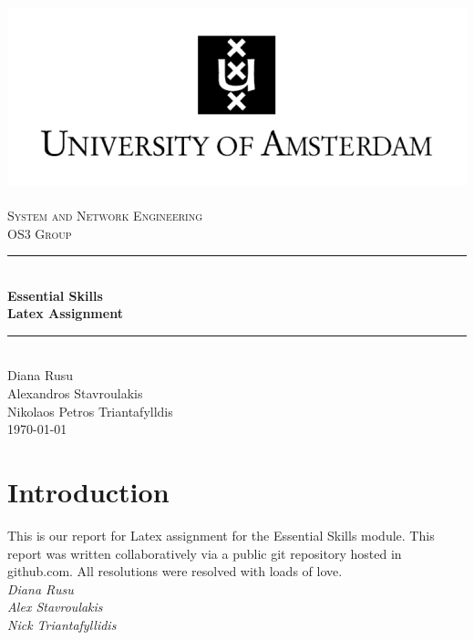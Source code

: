 \documentclass[a4paper,11pt]{report}
\newcommand{\HRule}{\rule{\linewidth}{0.5mm}}
\begin{document}
\begin{titlepage}

\begin{center}

\includegraphics{images/UvA-logo-2a.png}~\\[1cm]

\textsc{\LARGE System and Network Engineering\\ OS3 Group}\\[1.5cm]

\HRule \\

{ \huge \bfseries Essential Skills\\Latex Assignment}

\HRule \\[1cm]

\large{Diana Rusu} \\
\large{Alexandros Stavroulakis}\\
\large{Nikolaos Petros Triantafylldis}\\[11cm]

\today
\end{center}
\end{titlepage}

\tableofcontents

\listoffigures

\chapter* {Introduction}

This is our report for Latex assignment for the Essential Skills module. This report was written collaboratively via a public git repository hosted in github.com. All resolutions were resolved with loads of love. \\[0.5 cm]
\emph{Diana Rusu}\\
\emph{Alex Stavroulakis}\\
\emph{Nick Triantafyllidis}\\
\end{document}
